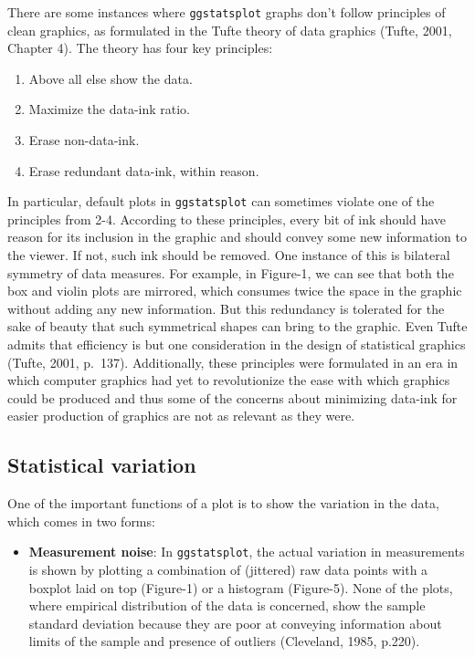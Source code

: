 \documentclass[]{article}
\providecommand{\tightlist}{%
  \setlength{\itemsep}{0pt}\setlength{\parskip}{0pt}}
\begin{document}
There are some instances where \texttt{ggstatsplot} graphs don't follow
principles of clean graphics, as formulated in the Tufte theory of data
graphics (Tufte, 2001, Chapter 4). The theory has four key principles:

\begin{enumerate}
\def\labelenumi{\arabic{enumi}.}
\tightlist
\item
  Above all else show the data.
\item
  Maximize the data-ink ratio.
\item
  Erase non-data-ink.
\item
  Erase redundant data-ink, within reason.
\end{enumerate}

In particular, default plots in \texttt{ggstatsplot} can sometimes
violate one of the principles from 2-4. According to these principles,
every bit of ink should have reason for its inclusion in the graphic and
should convey some new information to the viewer. If not, such ink
should be removed. One instance of this is bilateral symmetry of data
measures. For example, in Figure-1, we can see that both the box and
violin plots are mirrored, which consumes twice the space in the graphic
without adding any new information. But this redundancy is tolerated for
the sake of beauty that such symmetrical shapes can bring to the
graphic. Even Tufte admits that efficiency is but one consideration in
the design of statistical graphics (Tufte, 2001, p.~137). Additionally,
these principles were formulated in an era in which computer graphics
had yet to revolutionize the ease with which graphics could be produced
and thus some of the concerns about minimizing data-ink for easier
production of graphics are not as relevant as they were.

\hypertarget{statistical-variation}{%
\subsection{Statistical variation}\label{statistical-variation}}

One of the important functions of a plot is to show the variation in the
data, which comes in two forms:

\begin{itemize}
\tightlist
\item
  \textbf{Measurement noise}: In \texttt{ggstatsplot}, the actual
  variation in measurements is shown by plotting a combination of
  (jittered) raw data points with a boxplot laid on top (Figure-1) or a
  histogram (Figure-5). None of the plots, where empirical distribution
  of the data is concerned, show the sample standard deviation because
  they are poor at conveying information about limits of the sample and
  presence of outliers (Cleveland, 1985, p.220).
\end{itemize}
\end{document}
